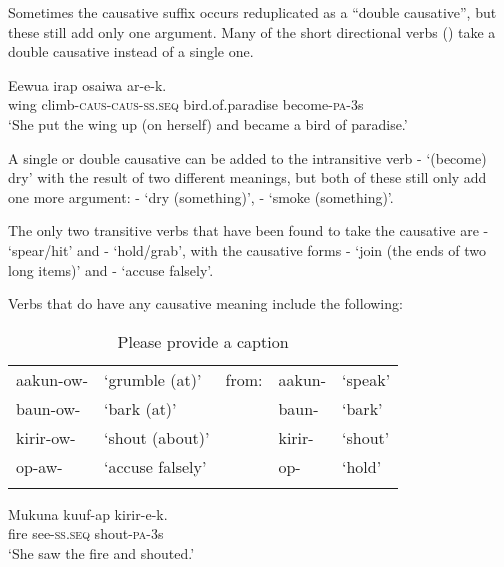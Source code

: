 Sometimes the causative suffix occurs reduplicated as a ``double causative'', but these still add only one argument. Many of the short directional verbs () take a double causative instead of a single one. 

\ea%
\label{ex:3:x205}
\gll Eewua irap osaiwa ar-e-k. \\
wing climb-\textsc{caus}-\textsc{caus}-\textsc{ss}.\textsc{seq} bird.of.paradise become-\textsc{pa}-3s \\
\glt`She put the wing up (on herself) and became a bird of paradise.'
\z

A single or double causative can be added to the intransitive verb - `(become) dry' with the result of two different meanings, but both of these still only add one more argument: - `dry (something)', - `smoke (something)'.

The only two transitive verbs that have been found to take the causative are - `spear/hit' and - `hold/grab', with the causative forms - `join (the ends of two long items)' and - `accuse falsely'. 

Verbs that do  have any causative meaning include the following:

\begin{table}
\caption{Please provide a caption}
 
\begin{tabular}{lllll}
\mytoprule
aakun-ow- &`grumble (at)' &from: &aakun- &`speak'\\
baun-ow- &`bark (at)' & &baun- &`bark'\\
kirir-ow- &`shout (about)' & &kirir- &`shout'\\
op-aw- &`accuse falsely' & &op- &`hold'\\
\mybottomrule
\end{tabular} 

\end{table}

\ea%
\label{ex:3:x991}
\gll Mukuna kuuf-ap kirir-e-k. \\
fire see-\textsc{ss}.\textsc{seq} shout-\textsc{pa}-3s\\
\glt`She saw the fire and shouted.'
\z

